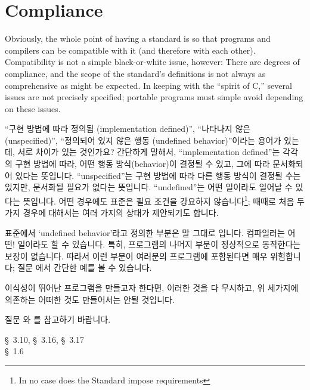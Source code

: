 \section{Compliance}
Obviously, the whole point of having a standard is so that programs and
compilers can be compatible with it (and therefore with each other).
Compatibility is not a simple black-or-white issue, however: There are
degrees of compliance, and the scope of the standard's definitions is not
always as comprehensive as might be expected.  In keeping with the
``spirit of C,'' several issues are not precisely specified; portable programs
must simple avoid depending on these issues.

\begin{faq}
	``구현 방법에 따라 정의됨 (implementation defined)'',
	``나타나지 않은 (unspecified)'', ``정의되어 있지 않은 행동 (undefined
	behavior)''이라는 용어가 있는데, 서로 차이가 있는 것인가요?
\A
	간단하게 말해서, ``implementation defined''는
	각각의 구현 방법에 따라, 어떤 행동 방식(behavior)이 결정될 수
	있고, 그에 따라 문서화되어 있다는 뜻입니다.
	``unspecified''는 구현 방법에 따라 다른 행동 방식이 결정될 수는
	있지만, 문서화될 필요가 없다는 뜻입니다.
	``undefined''는 어떤 일이라도 일어날 수 있다는 뜻입니다.
	어떤 경우에도 표준은 필요 조건을 강요하지
	않습니다\footnote{In no case does the Standard impose requirements};
	때때로 처음 두 가지 경우에 대해서는 여러 가지의 상태가 제안되기도
	합니다.	


	표준에서 `undefined behavior'라고 정의한 부분은 말 그대로 입니다.
	컴파일러는 어떤! 일이라도 할 수 있습니다.  특히, 프로그램의
	나머지 부분이 정상적으로 동작한다는 보장이 없습니다.
	따라서 이런 부분이 여러분의 프로그램에 포함된다면 매우 위험합니다;
	질문 에서 간단한 예를 볼 수 있습니다.

	이식성이 뛰어난 프로그램을 만들고자 한다면, 이러한 것을 다 무시하고,
	위 세가지에 의존하는 어떠한 것도 만들어서는 안될 것입니다.

	질문 와 를 참고하기 바랍니다.

\R
	\cite{c89} \S\ 3.10, \S\ 3.16, \S\ 3.17 \\
	\cite{rationale} \S\ 1.6
\end{faq}

